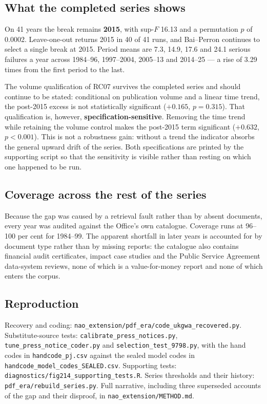 \subsection*{What the completed series shows}

On 41 years the break remains \textbf{2015}, with sup-$F$ 16.13 and a permutation
$p$ of 0.0002. Leave-one-out returns 2015 in 40 of 41 runs, and Bai--Perron
continues to select a single break at 2015. Period means are 7.3, 14.9, 17.6 and 24.1
serious failures a year across 1984--96, 1997--2004, 2005--13 and 2014--25 --- a rise of
3.29 times from the first period to the last.

The volume qualification of RC07 survives the completed series and should continue to be stated:
conditional on publication volume and a linear time trend, the post-2015 excess is not
statistically significant ($+0.165$, $p=0.315$). That qualification is, however,
\textbf{specification-sensitive}. Removing the time trend while retaining the volume control makes
the post-2015 term significant ($+0.632$, $p<0.001$). This
is not a robustness gain: without a trend the indicator absorbs the general upward drift of the
series. Both specifications are printed by the supporting script so that the sensitivity is
visible rather than resting on which one happened to be run.

\subsection*{Coverage across the rest of the series}

Because the gap was caused by a retrieval fault rather than by absent documents, every year was
audited against the Office's own catalogue. Coverage runs at 96--100 per cent for 1984--99. The
apparent shortfall in later years is accounted for by document type rather than by missing
reports: the catalogue also contains financial audit certificates, impact case studies and the
Public Service Agreement data-system reviews, none of which is a value-for-money report and none
of which enters the corpus.

\subsection*{Reproduction}

Recovery and coding: \texttt{nao\_extension/pdf\_era/code\_ukgwa\_recovered.py}. Substitute-source
tests: \texttt{calibrate\_press\_notices.py}, \texttt{tune\_press\_notice\_coder.py} and
\texttt{selection\_test\_9798.py}, with the hand codes in \texttt{handcode\_pj.csv} against the
sealed model codes in \texttt{handcode\_model\_codes\_SEALED.csv}. Supporting tests:
\texttt{diagnostics/fig214\_supporting\_tests.R}. Series thresholds and their history:
\texttt{pdf\_era/rebuild\_series.py}. Full narrative, including three superseded accounts of the
gap and their disproof, in \texttt{nao\_extension/METHOD.md}.

